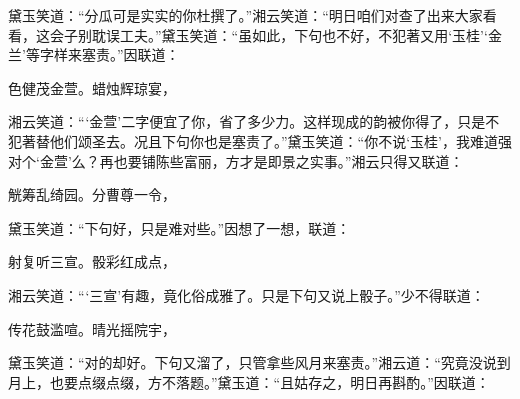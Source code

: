 \begin{parag}
    黛玉笑道：“分瓜可是实实的你杜撰了。”湘云笑道：“明日咱们对查了出来大家看看，这会子别耽误工夫。”黛玉笑道：“虽如此，下句也不好，不犯著又用‘玉桂’‘金兰’等字样来塞责。”因联道：
\end{parag}


\begin{poem}
    \begin{pl}
        色健茂金萱。蜡烛辉琼宴，
    \end{pl}
\end{poem}


\begin{parag}
    湘云笑道：“‘金萱’二字便宜了你，省了多少力。这样现成的韵被你得了，只是不犯著替他们颂圣去。况且下句你也是塞责了。”黛玉笑道：“你不说‘玉桂’，我难道强对个‘金萱’么？再也要铺陈些富丽，方才是即景之实事。”湘云只得又联道：
\end{parag}


\begin{poem}
    \begin{pl}
        觥筹乱绮园。分曹尊一令，
    \end{pl}
\end{poem}


\begin{parag}
    黛玉笑道：“下句好，只是难对些。”因想了一想，联道：
\end{parag}


\begin{poem}
    \begin{pl}
        射复听三宣。骰彩红成点，

    \end{pl}
\end{poem}


\begin{parag}
    湘云笑道：“‘三宣’有趣，竟化俗成雅了。只是下句又说上骰子。”少不得联道：
\end{parag}


\begin{poem}
    \begin{pl}

        传花鼓滥喧。晴光摇院宇，

    \end{pl}
\end{poem}


\begin{parag}
    黛玉笑道：“对的却好。下句又溜了，只管拿些风月来塞责。”湘云道：“究竟没说到月上，也要点缀点缀，方不落题。”黛玉道：“且姑存之，明日再斟酌。”因联道：
\end{parag}


